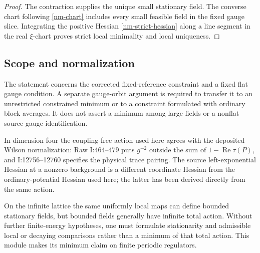 \documentclass[11pt]{article}
\theoremstyle{remark}\newtheorem{remark}[theorem]{Remark}
\begin{document}
\begin{proof}
The contraction supplies the unique small stationary field. The
converse chart following \eqref{nm-chart} includes every small
feasible field in the fixed gauge slice. Integrating the positive
Hessian \eqref{nm-strict-hessian} along a line segment in the real
$\xi$-chart proves strict local minimality and local uniqueness.
\end{proof}

\subsection{Scope and normalization}
\label{nm-scope}

The statement concerns the corrected fixed-reference constraint
and a fixed flat gauge condition. A separate gauge-orbit argument
is required to transfer it to an unrestricted constrained minimum
or to a constraint formulated with ordinary block averages. It
does not assert a minimum among large fields or a nonflat source
gauge identification.

In dimension four the coupling-free action used here agrees with
the deposited Wilson normalization: Raw I:464--479 puts $g^{-2}$
outside the sum of $1-\operatorname{Re}\tau(P)$, and
I:12756--12760 specifies the physical trace pairing. The source
left-exponential Hessian at a nonzero background is a different
coordinate Hessian from the ordinary-potential Hessian used here;
the latter has been derived directly from the same action.

On the infinite lattice the same uniformly local maps can define
bounded stationary fields, but bounded fields generally have
infinite total action. Without further finite-energy hypotheses,
one must formulate stationarity and admissible local or decaying
comparisons rather than a minimum of that total action. This
module makes its minimum claim on finite periodic regulators.
\end{document}
